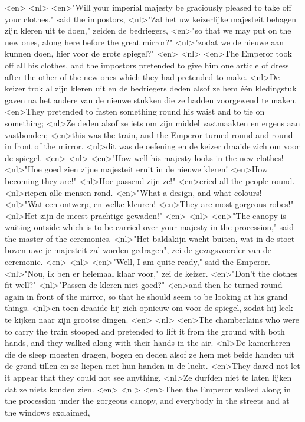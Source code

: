 <en>
<nl>
<en>"Will your imperial majesty be graciously pleased to take off your clothes," said the impostors,
<nl>"Zal het uw keizerlijke majesteit behagen zijn kleren uit te doen," zeiden de bedriegers,
<en>"so that we may put on the new ones, along here before the great mirror?"
<nl>"zodat we de nieuwe aan kunnen doen, hier voor de grote spiegel?"
<en>
<nl>
<en>The Emperor took off all his clothes, and the impostors pretended to give him one article of dress after the other of the new ones which they had pretended to make.
<nl>De keizer trok al zijn kleren uit en de bedriegers deden alsof ze hem één kledingstuk gaven na het andere van de nieuwe stukken die ze hadden voorgewend te maken.
<en>They pretended to fasten something round his waist and to tie on something;
<nl>Ze deden alsof ze iets om zijn middel vastmaakten en ergens aan vastbonden;
<en>this was the train, and the Emperor turned round and round in front of the mirror.
<nl>dit was de oefening en de keizer draaide zich om voor de spiegel.
<en>
<nl>
<en>"How well his majesty looks in the new clothes!
<nl>"Hoe goed zien zijne majesteit eruit in de nieuwe kleren!
<en>How becoming they are!"
<nl>Hoe passend zijn ze!"
<en>cried all the people round.
<nl>riepen alle mensen rond.
<en>"What a design, and what colours!
<nl>"Wat een ontwerp, en welke kleuren!
<en>They are most gorgeous robes!"
<nl>Het zijn de meest prachtige gewaden!"
<en>
<nl>
<en>"The canopy is waiting outside which is to be carried over your majesty in the procession," said the master of the ceremonies.
<nl>"Het baldakijn wacht buiten, wat in de stoet boven uwe je majesteit zal worden gedragen", zei de gezagsvoerder van de ceremonie.
<en>
<nl>
<en>"Well, I am quite ready," said the Emperor.
<nl>"Nou, ik ben er helemaal klaar voor," zei de keizer.
<en>"Don't the clothes fit well?"
<nl>"Passen de kleren niet goed?"
<en>and then he turned round again in front of the mirror, so that he should seem to be looking at his grand things.
<nl>en toen draaide hij zich opnieuw om voor de spiegel, zodat hij leek te kijken naar zijn grootse dingen.
<en>
<nl>
<en>The chamberlains who were to carry the train stooped and pretended to lift it from the ground with both hands, and they walked along with their hands in the air.
<nl>De kamerheren die de sleep moesten dragen, bogen en deden alsof ze hem met beide handen uit de grond tillen en ze liepen met hun handen in de lucht.
<en>They dared not let it appear that they could not see anything.
<nl>Ze durfden niet te laten lijken dat ze niets konden zien.
<en>
<nl>
<en>Then the Emperor walked along in the procession under the gorgeous canopy, and everybody in the streets and at the windows exclaimed,
